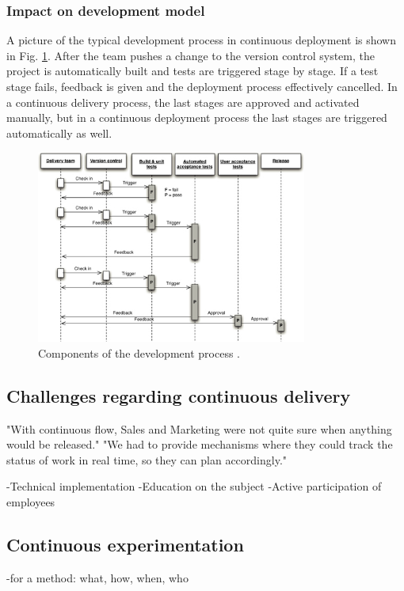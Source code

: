 \documentclass[english]{tktltiki2}
\theoremstyle{definition}
\theoremstyle{remark}
\begin{document}
\subsubsection{Impact on development model}

A picture of the typical development process in continuous deployment is shown in Fig. \ref{fig3}. After the team pushes a change to the version control system, the project is automatically built and tests are triggered stage by stage. If a test stage fails, feedback is given and the deployment process effectively cancelled. In a continuous delivery process, the last stages are approved and activated manually, but in a continuous deployment process the last stages are triggered automatically as well.

\begin{figure}[h]
	\centering
	\includegraphics[width=3.5in]{developmentprocess.jpg}
	\caption{Components of the development process \cite{cdbook}.}
	\label{fig3}
\end{figure}


\subsection{Challenges regarding continuous delivery}

"With continuous flow, Sales and Marketing were not quite sure when anything would be released." "We had to provide mechanisms where they could track the status of work in real time, so they can plan accordingly." \cite{neely2013continuous}



-Technical implementation
-Education on the subject
-Active participation of employees

\subsection{Continuous experimentation}
-for a method: what, how, when, who
\end{document}
